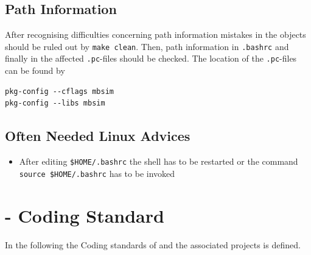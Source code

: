\subsection{Path Information}
After recognising difficulties concerning path information mistakes in the objects should be ruled out by \texttt{make clean}. Then, path information in \texttt{.bashrc} and finally in the affected \texttt{.pc}-files should be checked. The location of the \texttt{.pc}-files can be found by
\begin{verbatim}
pkg-config --cflags mbsim
pkg-config --libs mbsim
\end{verbatim}

\subsection{Often Needed Linux Advices}
\begin{itemize}
\item After editing \texttt{\$HOME/.bashrc} the shell has to be restarted or the command \texttt{source \$HOME/.bashrc} has to be invoked
\end{itemize}

\section{\MBSim{} - Coding Standard}
In the following the Coding standards of \MBSim{} and the associated projects is defined.

